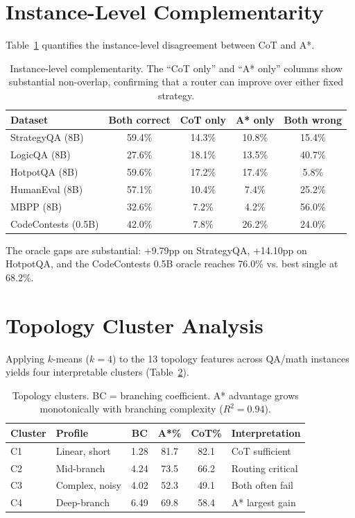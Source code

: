 \FloatBarrier
\section{Instance-Level Complementarity}

Table~\ref{tab:complementarity_thesis} quantifies the instance-level disagreement between CoT and A*.

\begin{table}[ht]
\centering
\small
\begin{tabular}{lcccc}
\toprule
\textbf{Dataset} & \textbf{Both correct} & \textbf{CoT only} & \textbf{A* only} & \textbf{Both wrong} \\
\midrule
StrategyQA (8B) & 59.4\% & 14.3\% & 10.8\% & 15.4\% \\
LogicQA (8B) & 27.6\% & 18.1\% & 13.5\% & 40.7\% \\
HotpotQA (8B) & 59.6\% & 17.2\% & 17.4\% & 5.8\% \\
\midrule
HumanEval (8B) & 57.1\% & 10.4\% & 7.4\% & 25.2\% \\
MBPP (8B) & 32.6\% & 7.2\% & 4.2\% & 56.0\% \\
CodeContests (0.5B) & 42.0\% & 7.8\% & 26.2\% & 24.0\% \\
\bottomrule
\end{tabular}
\caption{Instance-level complementarity. The ``CoT only'' and ``A* only'' columns show substantial non-overlap, confirming that a router can improve over either fixed strategy.}
\label{tab:complementarity_thesis}
\end{table}

The oracle gaps are substantial: +9.79pp on StrategyQA, +14.10pp on HotpotQA, and the CodeContests 0.5B oracle reaches 76.0\% vs. best single at 68.2\%.

\FloatBarrier
\section{Topology Cluster Analysis}

Applying $k$-means ($k=4$) to the 13 topology features across QA/math instances yields four interpretable clusters (Table~\ref{tab:clusters_thesis}).

\begin{table}[ht]
\centering
\small
\begin{tabular}{llcccl}
\toprule
\textbf{Cluster} & \textbf{Profile} & \textbf{BC} & \textbf{A*\%} & \textbf{CoT\%} & \textbf{Interpretation} \\
\midrule
C1 & Linear, short & 1.28 & 81.7 & 82.1 & CoT sufficient \\
C2 & Mid-branch & 4.24 & 73.5 & 66.2 & Routing critical \\
C3 & Complex, noisy & 4.02 & 52.3 & 49.1 & Both often fail \\
C4 & Deep-branch & 6.49 & 69.8 & 58.4 & A* largest gain \\
\bottomrule
\end{tabular}
\caption{Topology clusters. BC = branching coefficient. A* advantage grows monotonically with branching complexity ($R^2 = 0.94$).}
\label{tab:clusters_thesis}
\end{table}

